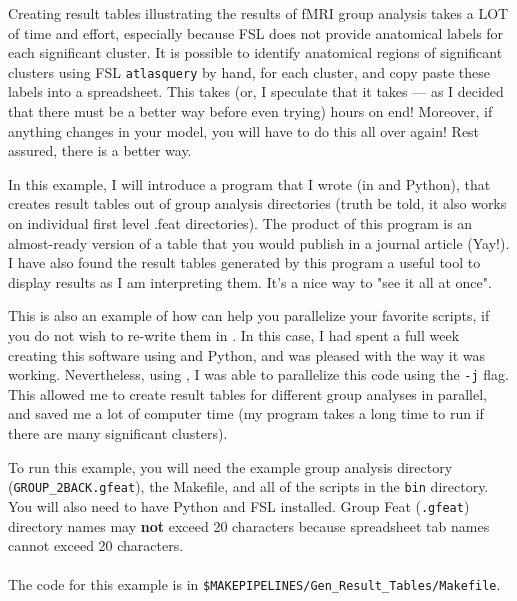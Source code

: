 
Creating result tables illustrating the results of fMRI group analysis takes a LOT of time and effort, especially because FSL does not provide anatomical labels for each significant cluster. It is possible to identify anatomical regions of significant clusters using FSL \texttt{atlasquery} by hand, for each cluster, and copy paste these labels into a spreadsheet. This takes (or, I speculate that it takes --- as I decided that there must be a better way before even trying) hours on end! Moreover, if anything changes in your model, you will have to do this all over again! Rest assured, there is a better way.

In this example, I will introduce a program that I wrote (in \bashn{} and Python), that  creates result tables out of group analysis directories (truth be told, it also works on individual first level .feat directories). The product of this program is an almost-ready version of a table that you would publish in a journal article (Yay!). I have also found the result tables generated by this program a useful tool to display results as I am interpreting them. It's a nice way to "see it all at once".

This is also an example of how \maken{} can help you parallelize your favorite scripts, if you do not wish to re-write them in \maken{}. In this case, I had spent a full week creating this software using \bashn{} and Python, and was pleased with the way it was working. Nevertheless, using \maken{}, I was able to parallelize this code using the \texttt{-j} flag. This allowed me to create result tables for different group analyses in parallel, and saved me a lot of computer time (my program takes a long time to run if there are many significant clusters). 

To run this example, you will need the example group analysis directory (\texttt{GROUP_2BACK.gfeat}), the Makefile, and all of the scripts in the \texttt{bin} directory. You will also need to have Python and FSL installed. Group Feat (\texttt{.gfeat}) directory names may \textbf{not} exceed 20 characters because spreadsheet tab names cannot exceed 20 characters. 

\paragraph{}The code for this example is in \texttt{\$MAKEPIPELINES/Gen_Result_Tables/Makefile}.

